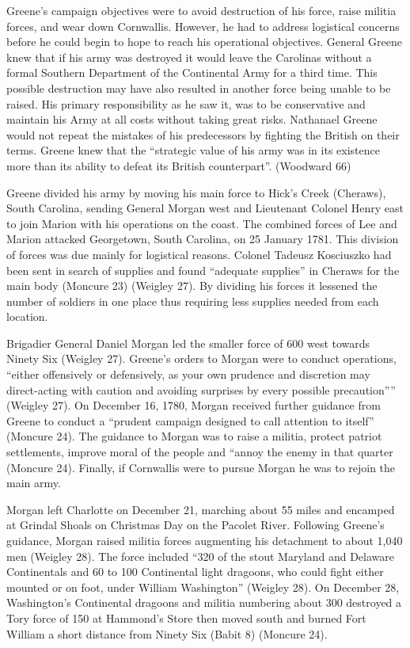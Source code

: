 Greene's campaign objectives were to avoid destruction of his force, raise militia forces, and wear down Cornwallis.  However, he had to address logistical concerns before he could begin to hope to reach his operational objectives.   General Greene knew that if his army was destroyed it would leave the Carolinas without a formal Southern Department of the Continental Army for a third time.   This possible destruction may have also resulted in another force being unable to be raised.  His primary responsibility as he saw it, was to be conservative and maintain his Army at all costs without taking great risks. Nathanael Greene would not repeat the mistakes of his predecessors by fighting the British on their terms.   Greene knew that the ``strategic value of his army was in its existence more than its ability to defeat its British counterpart''. (Woodward 66)

Greene divided his army by moving his main force to Hick's Creek (Cheraws), South Carolina, sending General Morgan west and Lieutenant Colonel Henry east to join Marion with his operations on the coast.  The combined forces of Lee and Marion attacked Georgetown, South Carolina, on 25 January 1781.  This division of forces was due mainly for logistical reasons.  Colonel Tadeusz Kosciuszko had been sent in search of supplies and found ``adequate supplies'' in Cheraws for the main body (Moncure 23) (Weigley 27).   By dividing his forces it lessened the number of soldiers in one place thus requiring less supplies needed from each location. 

Brigadier General Daniel Morgan led the smaller force of 600 west towards Ninety Six (Weigley 27).  Greene's orders to Morgan were to conduct operations, ``either offensively or defensively, as your own prudence and discretion may direct-acting with caution and avoiding surprises by every possible precaution'''' (Weigley 27).  On December 16, 1780, Morgan received further guidance from Greene to conduct a ``prudent campaign designed to call attention to itself'' (Moncure 24).  The guidance to Morgan was to raise a militia, protect patriot settlements, improve moral of the people and ``annoy the enemy in that quarter (Moncure 24).  Finally, if Cornwallis were to pursue Morgan he was to rejoin the main army.

Morgan left Charlotte on December 21, marching about 55 miles and encamped at Grindal Shoals on Christmas Day on the Pacolet River.  Following Greene's guidance, Morgan raised militia forces augmenting his detachment to about 1,040 men (Weigley 28).   The force included ``320 of the stout Maryland and Delaware Continentals and 60 to 100 Continental light dragoons, who could fight either mounted or on foot, under William Washington'' (Weigley 28).   On December 28, Washington's Continental dragoons and militia numbering about 300 destroyed a Tory force of 150 at Hammond's Store then moved south and burned Fort William a short distance from Ninety Six (Babit 8) (Moncure 24).

